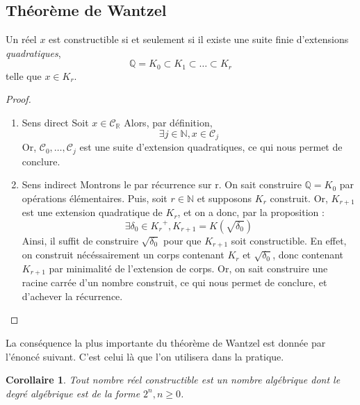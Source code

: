 \documentclass[a4paper,12pt,french,draft]{report}
\newtheorem{corollaire}{Corollaire}[section]
\begin{document}
		\subsection{Théorème de Wantzel}
			\begin{theorem}
				Un réel \( x \) est constructible si et seulement si il existe une suite finie d'extensions \emph{quadratiques},
					\[
					\mathbb{Q} = K_0 \subset K_1 \subset \dots \subset K_r
					\]
				telle que \( x \in K_r \).
			\end{theorem}
			\begin{proof}
				\begin{enumerate}
					\item{Sens direct}
					Soit \(x \in \mathscr{C}_\mathbb{R}\)
					Alors, par définition, 
					\[\exists j \in \mathbb{N}, x \in \mathscr{C}_j
					\]
					Or, \(\mathscr{C}_0, \dots, \mathscr{C}_j\) est une suite d'extension quadratiques, ce qui nous permet de conclure.
					\item{Sens indirect} Montrons le par récurrence sur r. On sait construire \(\mathbb{Q} = K_0\) par opérations élémentaires. Puis, soit \(r \in \mathbb{N}\) et supposons \(K_r \) construit. Or, \(K_{r+1}\) est une extension quadratique de \(K_{r}\), et on a donc, par la proposition :
					\[
					\exists \delta_0 \in {K_r}^+, K_{r+1} = K(\sqrt{\delta_0})
					\]
					Ainsi, il suffit de construire \(\sqrt{\delta_0}\) pour que \(K_{r+1}\) soit constructible. En effet, on construit nécéssairement un corps contenant \(K_r\) et \(\sqrt{\delta_0}\), donc contenant \(K_{r+1}\) par minimalité de l'extension de corps.
					Or, on sait construire une racine carrée d'un nombre construit, ce qui nous permet de conclure, et d'achever la récurrence.
				\end{enumerate}
			\end{proof}
		La conséquence la plus importante du théorème de Wantzel est donnée par l'énoncé suivant. C'est celui là que l'on utilisera dans la pratique.
			
		    \begin{corollaire}
		     Tout nombre réel constructible est un nombre algébrique dont le degré algébrique est de la forme \( 2^{n}, n\geq 0 \).
		     \end{corollaire}   
		     
\end{document}
